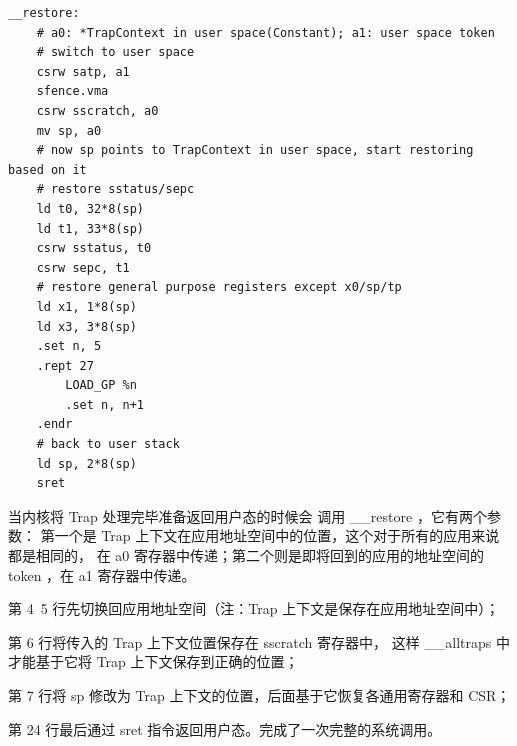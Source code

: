 \begin{lstlisting}[language={riscv}, label={code:restore},
    caption={__restore}]
__restore:
    # a0: *TrapContext in user space(Constant); a1: user space token
    # switch to user space
    csrw satp, a1
    sfence.vma
    csrw sscratch, a0
    mv sp, a0
    # now sp points to TrapContext in user space, start restoring based on it
    # restore sstatus/sepc
    ld t0, 32*8(sp)
    ld t1, 33*8(sp)
    csrw sstatus, t0
    csrw sepc, t1
    # restore general purpose registers except x0/sp/tp
    ld x1, 1*8(sp)
    ld x3, 3*8(sp)
    .set n, 5
    .rept 27
        LOAD_GP %n
        .set n, n+1
    .endr
    # back to user stack
    ld sp, 2*8(sp)
    sret
\end{lstlisting}

当内核将 Trap 处理完毕准备返回用户态的时候会 调用 __restore ，它有两个参数：
第一个是 Trap 上下文在应用地址空间中的位置，这个对于所有的应用来说都是相同的，
在 a0 寄存器中传递；第二个则是即将回到的应用的地址空间的 token ，在 a1 寄存器中传递。

第 4~5 行先切换回应用地址空间（注：Trap 上下文是保存在应用地址空间中）；

第 6 行将传入的 Trap 上下文位置保存在 sscratch 寄存器中，
这样 __alltraps 中才能基于它将 Trap 上下文保存到正确的位置；

第 7 行将 sp 修改为 Trap 上下文的位置，后面基于它恢复各通用寄存器和 CSR；

第 24 行最后通过 sret 指令返回用户态。完成了一次完整的系统调用。
